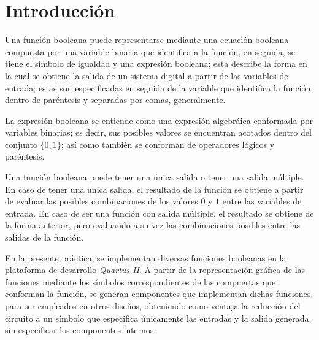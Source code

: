 \documentclass[../main.tex]{subfiles}
\begin{document}
\clearpage
\section{Introducción}
Una función booleana puede representarse mediante una ecuación booleana 
compuesta por una variable binaria que identifica a la función, en seguida, se 
tiene el símbolo de igualdad y una expresión booleana; esta describe la forma 
en la cual se obtiene la salida de un sistema digital a partir de las 
variables de entrada; estas son especificadas en seguida de la variable que 
identifica la función, dentro de paréntesis y separadas por comas, 
generalmente.

La expresión booleana se entiende como una expresión algebráica conformada por 
variables binarias; es decir, sus posibles valores se encuentran acotados 
dentro del conjunto $\{0,1\}$; así como también se conforman de operadores 
lógicos y paréntesis.

Una función booleana puede tener una única salida o tener una salida múltiple.  
En caso de tener una única salida, el resultado de la función se obtiene a 
partir de evaluar las posibles combinaciones de los valores $0$ y $1$ entre 
las variables de entrada. En caso de ser una función con salida múltiple, el 
resultado se obtiene de la forma anterior, pero evaluando a su vez las 
combinaciones posibles entre las salidas de la función.

En la presente práctica, se implementan diversas funciones booleanas en la 
plataforma de desarrollo \textit{Quartus II}. A partir de la representación 
gráfica de las funciones mediante los símbolos correspondientes de las 
compuertas que conforman la función, se generan componentes que implementan 
dichas funciones, para ser empleados en otros diseños, obteniendo como ventaja 
la reducción del circuito a un símbolo que especifica únicamente las entradas 
y la salida generada, sin especificar los componentes internos.  
\end{document}
